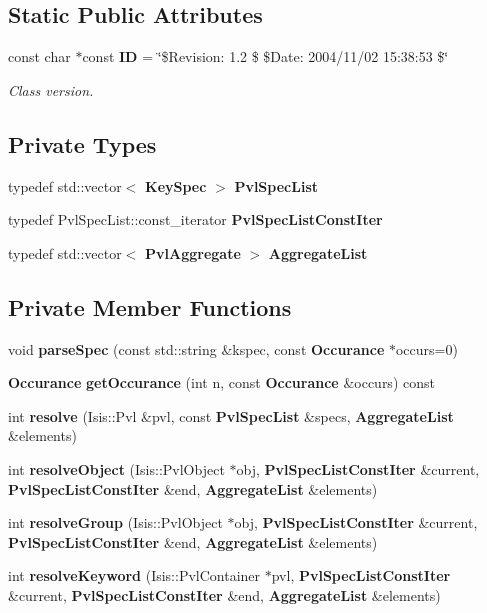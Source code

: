 \subsection*{Static Public Attributes}
\begin{CompactItemize}
\item 
const char $\ast$const {\bf ID} = \char`\"{}\$Revision: 1.2 \$ \$Date: 2004/11/02 15:38:53 \$\char`\"{}
\begin{CompactList}\small\item\em Class version. \item\end{CompactList}\end{CompactItemize}
\subsection*{Private Types}
\begin{CompactItemize}
\item 
typedef std::vector$<$ {\bf Key\-Spec} $>$ {\bf Pvl\-Spec\-List}
\item 
typedef Pvl\-Spec\-List::const\_\-iterator {\bf Pvl\-Spec\-List\-Const\-Iter}
\item 
typedef std::vector$<$ {\bf Pvl\-Aggregate} $>$ {\bf Aggregate\-List}
\end{CompactItemize}
\subsection*{Private Member Functions}
\begin{CompactItemize}
\item 
void {\bf parse\-Spec} (const std::string \&kspec, const {\bf Occurance} $\ast$occurs=0)
\item 
{\bf Occurance} {\bf get\-Occurance} (int n, const {\bf Occurance} \&occurs) const
\item 
int {\bf resolve} (Isis::Pvl \&pvl, const {\bf Pvl\-Spec\-List} \&specs, {\bf Aggregate\-List} \&elements)
\item 
int {\bf resolve\-Object} (Isis::Pvl\-Object $\ast$obj, {\bf Pvl\-Spec\-List\-Const\-Iter} \&current, {\bf Pvl\-Spec\-List\-Const\-Iter} \&end, {\bf Aggregate\-List} \&elements)
\item 
int {\bf resolve\-Group} (Isis::Pvl\-Object $\ast$obj, {\bf Pvl\-Spec\-List\-Const\-Iter} \&current, {\bf Pvl\-Spec\-List\-Const\-Iter} \&end, {\bf Aggregate\-List} \&elements)
\item 
int {\bf resolve\-Keyword} (Isis::Pvl\-Container $\ast$pvl, {\bf Pvl\-Spec\-List\-Const\-Iter} \&current, {\bf Pvl\-Spec\-List\-Const\-Iter} \&end, {\bf Aggregate\-List} \&elements)
\end{CompactItemize}

